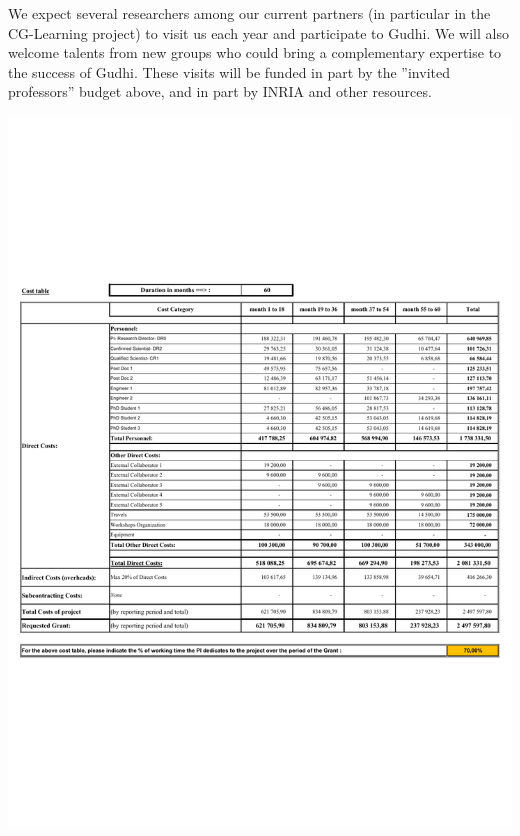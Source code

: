 We expect several researchers among our current partners (in particular in the CG-Learning project) to visit us each year and participate to Gudhi. We will also welcome talents from new groups who could bring a complementary expertise to the success of Gudhi. These visits will be funded in part by the ”invited professors” budget above, and in part by INRIA and other resources.
\vspace{4mm}

\includegraphics[width=\textwidth]{budget2}


\newpage

{\footnotesize
%


}

